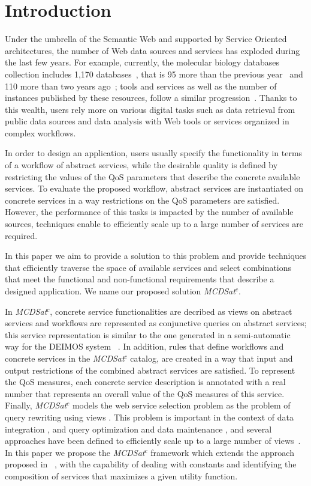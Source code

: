 \documentclass{llncs}
\begin{document}
\section{Introduction}
Under the umbrella of the Semantic Web and supported by Service Oriented architectures, the number of Web data sources and services has exploded during the last few years.  For example,  currently, the molecular biology databases
collection includes 1,170 databases~\cite{Galperin09}, that is
95 more than the previous year~\cite{Galperin2008} and 110 more than two years ago~\cite{Galperin2007};  tools
and services as well as the number of instances published by these resources, follow a similar progression~\cite{Benson07}. Thanks
to this wealth, users rely more on various
digital tasks such as data retrieval from public data sources and
data analysis with Web tools or services organized in
complex workflows.  

In order to design an application, users usually specify the functionality in terms of a workflow of abstract services, while the desirable quality  is defined by restricting the values of the QoS parameters that describe the concrete available services. To evaluate the proposed workflow,  abstract services are instantiated on concrete services in a way restrictions on the QoS parameters are satisfied.  However, the performance of this tasks is impacted by the number of available sources,  techniques enable to efficiently scale up to a large number of services are required. 

In this paper we aim to provide a solution to this problem and provide techniques that efficiently traverse the space of available services and select combinations that meet the functional and non-functional requirements that describe a designed application.  We name our proposed solution {\it MCDSat}$^c$. 

In {\it MCDSat}$^c$, concrete service functionalities are decribed as views on abstract services and workflows are represented as conjunctive queries on abstract services; this service representation is similar to the one generated in a semi-automatic way for the {\cal DEIMOS} system ~\cite{AmbiteISWC09}.  In addition, rules that define workflows and  concrete services in the {\it MCDSat}$^c$ catalog,  are created in a way that input and output restrictions of the combined abstract services are satisfied. To represent the QoS measures, each concrete service description is annotated with a real number that represents an overall value of the QoS measures of this service.  Finally, {\it MCDSat}$^c$ models the web service selection problem as the problem of query rewriting using views \cite{halevy:survey}. This problem is important in the context of data integration
\cite{Chen05,JaudoinPRST05}, and query optimization and data maintenance \cite{AfratiLU07,levy:bucket}, and several approaches have been defined to efficiently scale up to a large number of views~\cite{arvelo:aaai06,pods:DuschkaG97,sac:DuschkaG97,levy:bucket,pottinger:minicon}. In this paper we propose the {\it MCDSat}$^c$ framework which extends the approach proposed in ~\cite{arvelo:aaai06},  with the capability of dealing with constants and identifying the composition of services that maximizes a given utility function. 
\end{document}
